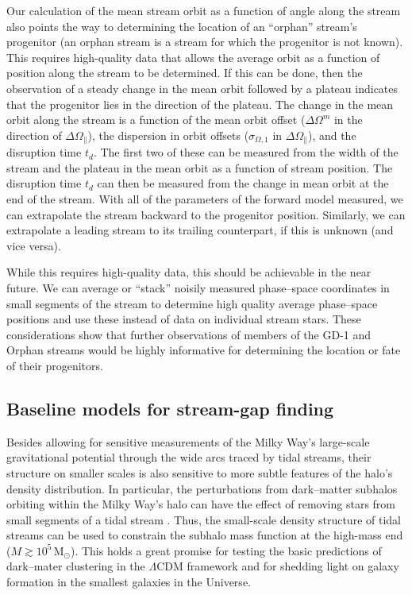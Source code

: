 \documentclass[12pt,preprint]{aastex}
\newcommand{\msun}{\ensuremath{\,\mathrm{M}_{\odot}}}
\newcommand{\opar}{\ensuremath{\Omega_\parallel}}
\begin{document}
Our calculation of the mean stream orbit as a function of angle along
the stream also points the way to determining the location of an
``orphan'' stream's progenitor (an orphan stream is a stream for which
the progenitor is not known). This requires high-quality data that
allows the average orbit as a function of position along the stream to
be determined. If this can be done, then the observation of a steady
change in the mean orbit followed by a plateau indicates that the
progenitor lies in the direction of the plateau. The change in the
mean orbit along the stream is a function of the mean orbit offset
($\Delta \Omega^m$ in the direction of $\Delta \opar$), the dispersion
in orbit offsets ($\sigma_{\Omega,1}$ in $\Delta \opar$), and the
disruption time $t_d$. The first two of these can be measured from the
width of the stream and the plateau in the mean orbit as a function of
stream position. The disruption time $t_d$ can then be measured from
the change in mean orbit at the end of the stream. With all of the
parameters of the forward model measured, we can extrapolate the
stream backward to the progenitor position. Similarly, we can
extrapolate a leading stream to its trailing counterpart, if this is
unknown (and vice versa).

While this requires high-quality data, this should be achievable in
the near future. We can average or ``stack'' noisily measured
phase--space coordinates in small segments of the stream to determine
high quality average phase--space positions and use these instead of
data on individual stream stars. These considerations show that
further observations of members of the GD-1 and Orphan streams would
be highly informative for determining the location or fate of their
progenitors.

\subsection{Baseline models for stream-gap finding}

Besides allowing for sensitive measurements of the Milky Way's
large-scale gravitational potential through the wide arcs traced by
tidal streams, their structure on smaller scales is also sensitive to
more subtle features of the halo's density distribution. In
particular, the perturbations from dark--matter subhalos orbiting
within the Milky Way's halo can have the effect of removing stars from
small segments of a tidal stream \citep{Yoon11a,Carlberg12a}. Thus,
the small-scale density structure of tidal streams can be used to
constrain the subhalo mass function at the high-mass end ($M \gtrsim
10^5\msun$). This holds a great promise for testing the basic
predictions of dark--mater clustering in the $\Lambda$CDM framework
and for shedding light on galaxy formation in the smallest galaxies in
the Universe.
\end{document}
